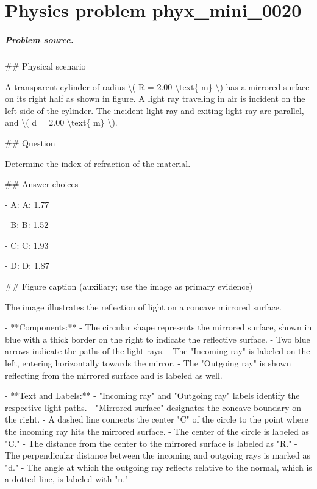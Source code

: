
\chapter{Physics problem phyx\_mini\_0020}
\label{ch:PhyXMiniProblems_problem_phyx_mini_0020}

\paragraph{Problem source.}
\#\# Physical scenario

A transparent cylinder of radius \textbackslash{}( R = 2.00 \textbackslash{}text\{ m\} \textbackslash{}) has a mirrored surface on its right half as shown in figure. A light ray traveling in air is incident on the left side of the cylinder. The incident light ray and exiting light ray are parallel, and \textbackslash{}( d = 2.00 \textbackslash{}text\{ m\} \textbackslash{}).

\#\# Question

Determine the index of refraction of the material.

\#\# Answer choices

- A: A: 1.77

- B: B: 1.52

- C: C: 1.93

- D: D: 1.87

\#\# Figure caption (auxiliary; use the image as primary evidence)

The image illustrates the reflection of light on a concave mirrored surface.

- **Components:**
  - The circular shape represents the mirrored surface, shown in blue with a thick border on the right to indicate the reflective surface.
  - Two blue arrows indicate the paths of the light rays.
  - The "Incoming ray" is labeled on the left, entering horizontally towards the mirror.
  - The "Outgoing ray" is shown reflecting from the mirrored surface and is labeled as well.

- **Text and Labels:**
  - "Incoming ray" and "Outgoing ray" labels identify the respective light paths.
  - "Mirrored surface" designates the concave boundary on the right.
  - A dashed line connects the center "C" of the circle to the point where the incoming ray hits the mirrored surface.
  - The center of the circle is labeled as "C."
  - The distance from the center to the mirrored surface is labeled as "R."
  - The perpendicular distance between the incoming and outgoing rays is marked as "d."
  - The angle at which the outgoing ray reflects relative to the normal, which is a dotted line, is labeled with "n."

